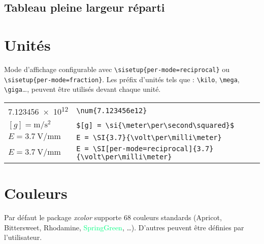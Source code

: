 \documentclass{article}
\let\code\lstinline
\begin{document}
\begin{multicols*}{3}
\subsection*{Tableau pleine largeur réparti}

\section*{Unités}
Mode d'affichage configurable avec \code+\sisetup{per-mode=reciprocal}+ ou \code+\sisetup{per-mode=fraction}+. Les préfix d'unités tels que : \code+\kilo+, \code+\mega+, \code+\giga+\dots, peuvent être utilisés devant chaque unité.

\begin{tabular}{p{2cm}l}
    \num{7.123456e12}                                          & \code+\num{7.123456e12}+                                        \\
    $[g] = \si{\meter\per\second\squared}$                     & \code!$[g] = \si{\meter\per\second\squared}$!                   \\
    $E = \SI[per-mode=fraction]{3.7}{\volt\per\milli\meter}$   & \code!E = \SI{3.7}{\volt\per\milli\meter}!                      \\
    $E = \SI[per-mode=reciprocal]{3.7}{\volt\per\milli\meter}$ & \code!E = \SI[per-mode=reciprocal]{3.7}{\volt\per\milli\meter}! \\[1em]
\end{tabular}

\section*{Couleurs}
Par défaut le package \emph{xcolor} supporte 68 couleurs standards (\textcolor{Apricot}{Apricot}, \textcolor{Bittersweet}{Bittersweet}, \textcolor{Rhodamine}{Rhodamine}, \textcolor{SpringGreen}{SpringGreen}, \dots). D'autres peuvent être définies par l'utilisateur.\par
\begin{latexcode}
    \usepackage{xcolor}
\end{latexcode}


\end{multicols*}
\end{document}
